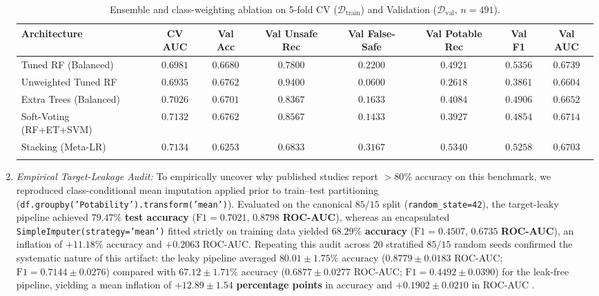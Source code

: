 \documentclass[pdflatex,sn-mathphys-num]{sn-jnl}%
\theoremstyle{thmstyleone}%
\theoremstyle{thmstyletwo}%
\theoremstyle{thmstylethree}%
\begin{document}
\begin{enumerate}
\begin{table}[t]
\caption{Ensemble and class-weighting ablation on 5-fold CV ($\mathcal{D}_{\text{train}}$) and Validation ($\mathcal{D}_{\text{val}}$, $n = 491$).}\label{tab:ensembles}%
\tiny\setlength{\tabcolsep}{1pt}
\begin{tabular*}{\textwidth}{@{\extracolsep\fill}lccccccc@{}}
\toprule
Architecture & CV AUC & Val Acc & Val Unsafe Rec & Val False-Safe & Val Potable Rec & Val F1 & Val AUC \\
\midrule
Tuned RF (Balanced) & $0.6981$ & $0.6680$ & $0.7800$ & $0.2200$ & $0.4921$ & $\mathbf{0.5356}$ & $\mathbf{0.6739}$ \\
Unweighted Tuned RF & $0.6935$ & $\mathbf{0.6762}$ & $\mathbf{0.9400}$ & $\mathbf{0.0600}$ & $0.2618$ & $0.3861$ & $0.6604$ \\
Extra Trees (Balanced) \cite{geurts2006} & $0.7026$ & $0.6701$ & $0.8367$ & $0.1633$ & $0.4084$ & $0.4906$ & $0.6652$ \\
Soft-Voting (RF+ET+SVM) & $0.7132$ & $\mathbf{0.6762}$ & $0.8567$ & $0.1433$ & $0.3927$ & $0.4854$ & $0.6714$ \\
Stacking (Meta-LR) & $\mathbf{0.7134}$ & $0.6253$ & $0.6833$ & $0.3167$ & $\mathbf{0.5340}$ & $0.5258$ & $0.6703$ \\
\botrule
\end{tabular*}
\end{table}

\item \textit{Empirical Target-Leakage Audit:} To empirically uncover why published studies report $>80\%$ accuracy on this benchmark, we reproduced class-conditional mean imputation applied prior to train--test partitioning (\texttt{df.groupby('Potability').transform('mean')}). Evaluated on the canonical $85/15$ split (\texttt{random\_state=42}), the target-leaky pipeline achieved $\mathbf{79.47\%}$ \textbf{test accuracy} ($\text{F1} = 0.7021$, $\mathbf{0.8798}$ \textbf{ROC-AUC}), whereas an encapsulated \texttt{SimpleImputer(strategy='mean')} fitted strictly on training data yielded $\mathbf{68.29\%}$ \textbf{accuracy} ($\text{F1} = 0.4507$, $\mathbf{0.6735}$ \textbf{ROC-AUC}), an inflation of $+11.18\%$ accuracy and $+0.2063$ ROC-AUC. Repeating this audit across $20$ stratified $85/15$ random seeds confirmed the systematic nature of this artifact: the leaky pipeline averaged $\mathbf{80.01 \pm 1.75\%}$ accuracy ($0.8779 \pm 0.0183$ ROC-AUC; $\text{F1} = 0.7144 \pm 0.0276$) compared with $\mathbf{67.12 \pm 1.71\%}$ accuracy ($0.6877 \pm 0.0277$ ROC-AUC; $\text{F1} = 0.4492 \pm 0.0390$) for the leak-free pipeline, yielding a mean inflation of $\mathbf{+12.89 \pm 1.54}$ \textbf{percentage points} in accuracy and $\mathbf{+0.1902 \pm 0.0210}$ in ROC-AUC \cite{kapoor2023,kaufman2012}.
\end{enumerate}
\end{document}
